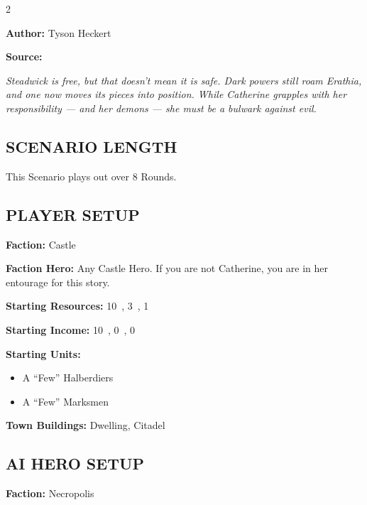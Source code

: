 \cleardoublepage{}

\begin{multicols*}{2}

\textbf{Author:} Tyson Heckert

\textbf{Source:} 

\textit{Steadwick is free, but that doesn't mean it is safe.
Dark powers still roam Erathia, and one now moves its pieces into position.
While Catherine grapples with her responsibility — and her demons — she must be a bulwark against evil.}

\subsection*{\MakeUppercase{Scenario length}}

This Scenario plays out over 8 Rounds.

\subsection*{\MakeUppercase{Player setup}}

\textbf{Faction:} Castle

\textbf{Faction Hero:} Any Castle Hero. If you are not Catherine, you are in her entourage for this story.

\textbf{Starting Resources:} 10~, 3~, 1~

\textbf{Starting Income:} 10~, 0~, 0~

\textbf{Starting Units:}
\begin{itemize}
  \item A ``Few'' Halberdiers
  \item A ``Few'' Marksmen
\end{itemize}

\textbf{Town Buildings:}  Dwelling, Citadel

\subsection*{\MakeUppercase{AI Hero setup}}

\textbf{Faction:} Necropolis


\end{multicols*}
